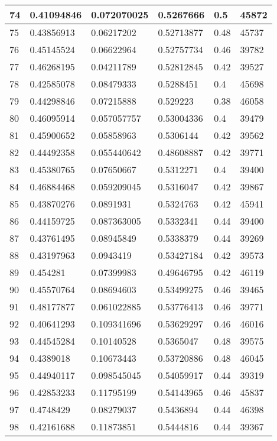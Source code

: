 \begin{longtable}{|l|l|l|l|l|l|}
74 & 0.41094846 & 0.072070025 & 0.5267666 & 0.5 & 45872 \\ \hline 
75 & 0.43856913 & 0.06217202 & 0.52713877 & 0.48 & 45737 \\ \hline 
76 & 0.45145524 & 0.06622964 & 0.52757734 & 0.46 & 39782 \\ \hline 
77 & 0.46268195 & 0.04211789 & 0.52812845 & 0.42 & 39527 \\ \hline 
78 & 0.42585078 & 0.08479333 & 0.5288451 & 0.4 & 45698 \\ \hline 
79 & 0.44298846 & 0.07215888 & 0.529223 & 0.38 & 46058 \\ \hline 
80 & 0.46095914 & 0.057057757 & 0.53004336 & 0.4 & 39479 \\ \hline 
81 & 0.45900652 & 0.05858963 & 0.5306144 & 0.42 & 39562 \\ \hline 
82 & 0.44492358 & 0.055440642 & 0.48608887 & 0.42 & 39771 \\ \hline 
83 & 0.45380765 & 0.07650667 & 0.5312271 & 0.4 & 39400 \\ \hline 
84 & 0.46884468 & 0.059209045 & 0.5316047 & 0.42 & 39867 \\ \hline 
85 & 0.43870276 & 0.0891931 & 0.5324763 & 0.42 & 45941 \\ \hline 
86 & 0.44159725 & 0.087363005 & 0.5332341 & 0.44 & 39400 \\ \hline 
87 & 0.43761495 & 0.08945849 & 0.5338379 & 0.44 & 39269 \\ \hline 
88 & 0.43197963 & 0.0943419 & 0.53427184 & 0.42 & 39573 \\ \hline 
89 & 0.454281 & 0.07399983 & 0.49646795 & 0.42 & 46119 \\ \hline 
90 & 0.45570764 & 0.08694603 & 0.53499275 & 0.46 & 39465 \\ \hline 
91 & 0.48177877 & 0.061022885 & 0.53776413 & 0.46 & 39771 \\ \hline 
92 & 0.40641293 & 0.109341696 & 0.53629297 & 0.46 & 46016 \\ \hline 
93 & 0.44545284 & 0.10140528 & 0.5365047 & 0.48 & 39575 \\ \hline 
94 & 0.4389018 & 0.10673443 & 0.53720886 & 0.48 & 46045 \\ \hline 
95 & 0.44940117 & 0.098545045 & 0.54059917 & 0.44 & 39319 \\ \hline 
96 & 0.42853233 & 0.11795199 & 0.54143965 & 0.46 & 45837 \\ \hline 
97 & 0.4748429 & 0.08279037 & 0.5436894 & 0.44 & 46398 \\ \hline 
98 & 0.42161688 & 0.11873851 & 0.5444816 & 0.44 & 39367 \\ \hline 

\end{longtable}
